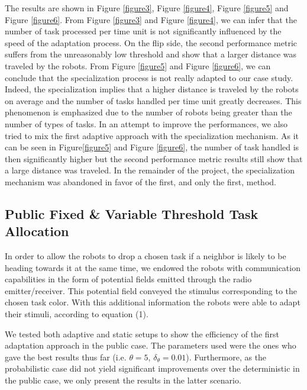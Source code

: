 The results are shown in Figure \ref{figure3}, Figure \ref{figure4}, Figure \ref{figure5} and Figure \ref{figure6}. From Figure \ref{figure3} and Figure \ref{figure4}, we can infer that the number of task processed per time unit is not significantly influenced by the speed of the adaptation process. On the flip side, the second performance metric suffers from the unreasonably low threshold and show that a larger distance was traveled by the robots. From Figure \ref{figure5} and Figure \ref{figure6}, we can conclude that the specialization process is not really adapted to our case study. Indeed, the specialization implies that a higher distance is traveled by the robots on average and the number of tasks handled per time unit greatly decreases. This phenomenon is emphasized due to the number of robots being greater than the number of types of tasks. In an attempt to improve the performances, we also tried to mix the first adaptive approach with the specialization mechanism. As it can be seen in Figure\ref{figure5} and Figure \ref{figure6}, the number of task handled is then significantly higher but the second performance metric results still show that a large distance was traveled. In the remainder of the project, the specialization mechanism was abandoned in favor of the first, and only the first, method.

\subsection{Public Fixed \& Variable Threshold Task Allocation}
In order to allow the robots to drop a chosen task if a neighbor is likely to be heading towards it at the same time, we endowed the robots with communication capabilities in the form of potential fields emitted through the radio emitter/receiver. This potential field conveyed the stimulus corresponding to the chosen task color. With this additional information the robots were able to adapt their stimuli, according to equation (1).

We tested both adaptive and static setups to show the efficiency of the first adaptation approach in the public case. The parameters used were the ones who gave the best results thus far (i.e. $\theta = 5$, $\delta_{\theta} = 0.01$). Furthermore, as the probabilistic case did not yield significant improvements over the deterministic in the public case, we only present the results in the latter scenario.

